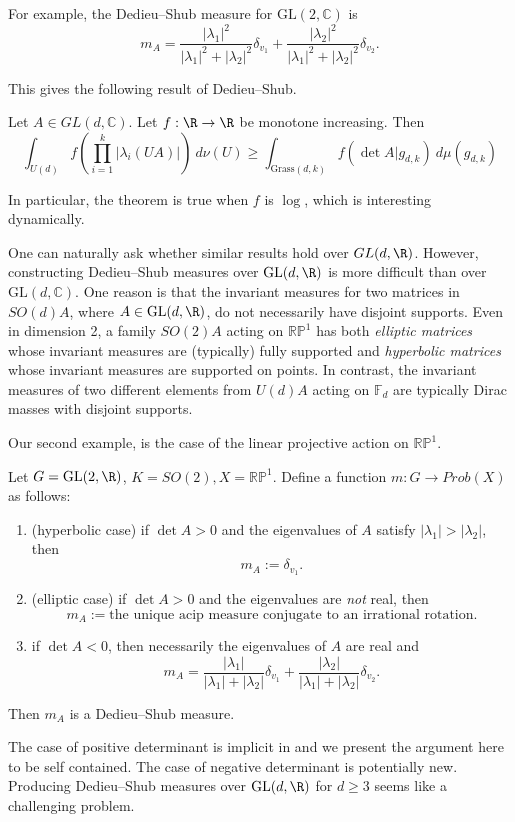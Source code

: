 \documentclass[10pt]{amsart}
\numberwithin{equation}{section}     %
\newcommand{\C}{\mathbb{C}}
\newcommand{\FF}{\mathbb{F}}
\newcommand{\RP}{\mathbb{RP}}
\newcommand{\GL}{\mathrm{GL}}
\begin{document}
For example, the Dedieu--Shub measure for $\GL(2,\C)$ is \begin{equation}
    m_A = \frac{|\lambda_1|^2}{|\lambda_1|^2 + |\lambda_2|^2} \delta_{v_1} + \frac{|\lambda_2|^2}{|\lambda_1|^2 + |\lambda_2|^2} \delta_{v_2}. \label{dim2weights}
\end{equation}  

This gives the following result of Dedieu--Shub. 

\begin{theorem} \label{originalineq}   
Let $A \in GL(d,\C)$. Let $f:\R \to \R$ be monotone increasing. Then 
 $$\int_{U(d)} f \left(\prod \limits_{i=1}^k |\lambda_i (UA )| \right) \ d\nu(U) \geq \int_{\text{Grass}(d,k)} f \left( \det A|g_{d,k} \right) \ d\mu(g_{d,k})$$
\end{theorem}
In particular, the theorem is true when $f$ is $\log$, which is interesting dynamically. 

One can naturally ask whether similar results hold over $GL(d,\R)$. However, constructing Dedieu--Shub measures over $\GL(d,\R)$ is more difficult than over $\GL(d,\C)$. One reason is that the invariant measures for two matrices in $SO(d)A$, where $A \in \GL(d,\R)$, do not necessarily have disjoint supports. Even in dimension 2, a family $SO(2)A$ acting on $\RP^1$ has both \textit{elliptic matrices} whose invariant measures are (typically) fully supported and \textit{hyperbolic matrices} whose invariant measures are supported on points. In contrast, the invariant measures of two different elements from $U(d)A$ acting on $\FF_d$ are typically Dirac masses with disjoint supports.

Our second example, is the case of the linear projective action on $\RP^1$. 
    
\begin{theorem}
\label{GL2R}
    Let $G = \text{GL}(2,\R)$, $K = SO(2), X = \RP^1$. Define a function $m:G \to Prob(X)$ as follows:
    \begin{enumerate}
        \item[\textit{(1)}] (hyperbolic case) if $\det A > 0$ and the eigenvalues of $A$ satisfy $|\lambda_1| > |\lambda_2|$, then $$m_A := \delta_{v_1}.$$
        \item[\textit{(2)}] (elliptic case) if $\det A > 0$ and the eigenvalues are \textit{not} real, then $$m_A := \text{the unique acip measure conjugate to an irrational rotation}.$$
        \item[\textit{(3)}] if $\det A <0$, then necessarily the eigenvalues of $A$ are real and $$m_A = \frac{|\lambda_1|}{|\lambda_1| + |\lambda_2|} \delta_{v_1} + \frac{|\lambda_2|}{|\lambda_1| + |\lambda_2|} \delta_{v_2}.$$
    \end{enumerate}
    
    
    Then $m_A$ is a Dedieu--Shub measure. 
\end{theorem}
The case of positive determinant is implicit in \cite{pujals2006expanding} and we present the argument here to be self contained. The case of negative determinant is potentially new. Producing Dedieu--Shub measures over $\GL(d,\R)$ for $d\geq 3$ seems like a challenging problem.
\end{document}
